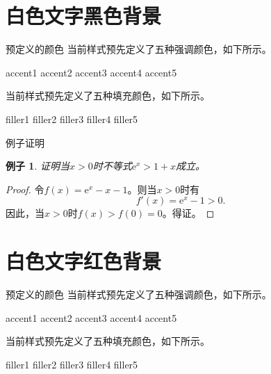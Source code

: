 \documentclass[14pt,notheorems,xcolor={rgb}]{beamer}
\newtheorem{example}[theorem]{例子}
\begin{document}

\begin{frame}[plain]\transboxout
\titlepage
\end{frame}

\section{白色文字黑色背景}

\begin{frame}{预定义的颜色}
当前样式预先定义了五种强调颜色，如下所示。
\begin{flushleft}
\textcolor{accent1}{accent1}
\textcolor{accent2}{accent2}
\textcolor{accent3}{accent3}
\textcolor{accent4}{accent4}
\textcolor{accent5}{accent5}
\end{flushleft}
当前样式预先定义了五种填充颜色，如下所示。
\begin{flushleft}
\colorbox{filler1}{filler1}
\colorbox{filler2}{filler2}
\colorbox{filler3}{filler3}
\colorbox{filler4}{filler4}
\colorbox{filler5}{filler5}
\end{flushleft}
\end{frame}

\begin{frame}{例子证明}
\begin{example}
证明当$x>0$时不等式$\mathrm{e}^x>1+x$成立。
\end{example}\pause
\begin{proof}
令$f(x)=\mathrm{e}^x-x-1$。则当$x>0$时有
$$f'(x)=\mathrm{e}^x-1>0.$$
因此，当$x>0$时$f(x)>f(0)=0$。得证。
\end{proof}
\end{frame}


\begin{frame}[plain]\transboxout
\titlepage
\end{frame}

\section{白色文字红色背景}

\begin{frame}{预定义的颜色}
当前样式预先定义了五种强调颜色，如下所示。
\begin{flushleft}
\textcolor{accent1}{accent1}
\textcolor{accent2}{accent2}
\textcolor{accent3}{accent3}
\textcolor{accent4}{accent4}
\textcolor{accent5}{accent5}
\end{flushleft}
当前样式预先定义了五种填充颜色，如下所示。
\begin{flushleft}
\colorbox{filler1}{filler1}
\colorbox{filler2}{filler2}
\colorbox{filler3}{filler3}
\colorbox{filler4}{filler4}
\colorbox{filler5}{filler5}
\end{flushleft}
\end{frame}
\end{document}
